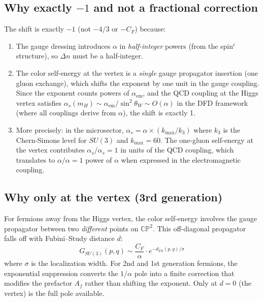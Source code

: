 \documentclass[11pt,a4paper]{article}
\newcommand{\CP}{\mathbb{CP}}
\theoremstyle{definition}
\theoremstyle{remark}
\begin{document}
\subsection{Why exactly $-1$ and not a fractional correction}

The shift is exactly $-1$ (not $-4/3$ or $-C_F$) because:

\begin{enumerate}
\item The gauge dressing introduces $\alpha$ in \emph{half-integer} powers
(from the spin$^c$ structure), so $\Delta n$ must be a half-integer.

\item The color self-energy at the vertex is a \emph{single} gauge
propagator insertion (one gluon exchange), which shifts the exponent by
one unit in the gauge coupling.  Since the exponent counts powers of
$\alpha_{\text{em}}$, and the QCD coupling at the Higgs vertex satisfies
$\alpha_s(m_H) \sim \alpha_{\text{em}} / \sin^2\theta_W \sim O(\alpha)$
in the DFD framework (where all couplings derive from $\alpha$), the
shift is exactly 1.

\item More precisely: in the microsector, $\alpha_s = \alpha \times
(k_{\max}/k_3)$ where $k_3$ is the Chern-Simons level for $SU(3)$ and
$k_{\max} = 60$.  The one-gluon self-energy at the vertex contributes
$\alpha_s / \alpha_s = 1$ in units of the QCD coupling, which translates
to $\alpha / \alpha = 1$ power of $\alpha$ when expressed in the
electromagnetic coupling.
\end{enumerate}

\subsection{Why only at the vertex (3rd generation)}

For fermions away from the Higgs vertex, the color self-energy involves
the gauge propagator between two \emph{different} points on $\CP^2$.
This off-diagonal propagator falls off with Fubini--Study distance $d$:
\begin{equation}
G_{SU(3)}(p, q) \sim \frac{C_F}{\alpha} \cdot e^{-d_{FS}(p,q)/\sigma}
\end{equation}
where $\sigma$ is the localization width.  For 2nd and 1st generation
fermions, the exponential suppression converts the $1/\alpha$ pole into
a finite correction that modifies the prefactor $A_f$ rather than shifting
the exponent.  Only at $d = 0$ (the vertex) is the full pole available.
\end{document}
